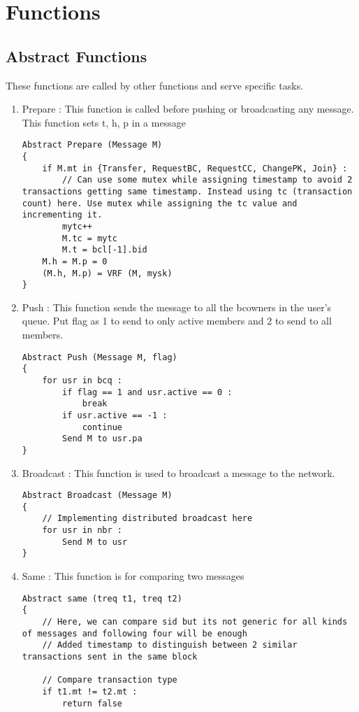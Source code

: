 \section{Functions}

\subsection{Abstract Functions}
These functions are called by other functions and serve specific tasks.
\begin{enumerate}
    \item Prepare : This function is called before pushing or broadcasting any message. This function sets t, h, p in a message
    \begin{lstlisting}
Abstract Prepare (Message M)
{
    if M.mt in {Transfer, RequestBC, RequestCC, ChangePK, Join} :
        // Can use some mutex while assigning timestamp to avoid 2 transactions getting same timestamp. Instead using tc (transaction count) here. Use mutex while assigning the tc value and incrementing it.
        mytc++
        M.tc = mytc
        M.t = bcl[-1].bid
    M.h = M.p = 0
    (M.h, M.p) = VRF (M, mysk)
}
    \end{lstlisting}
    \item Push : This function sends the message to all the bcowners in the user's queue. Put flag as 1 to send to only active members and 2 to send to all members.
    \begin{lstlisting}
Abstract Push (Message M, flag)
{
    for usr in bcq :
        if flag == 1 and usr.active == 0 :
            break
        if usr.active == -1 :
            continue
        Send M to usr.pa
}
    \end{lstlisting}
    \item Broadcast : This function is used to broadcast a message to the network.
    \begin{lstlisting}
Abstract Broadcast (Message M)
{
    // Implementing distributed broadcast here
    for usr in nbr :
        Send M to usr
}
    \end{lstlisting}
    \item Same : This function is for comparing two messages
    \begin{lstlisting}
Abstract same (treq t1, treq t2)
{
    // Here, we can compare sid but its not generic for all kinds of messages and following four will be enough
    // Added timestamp to distinguish between 2 similar transactions sent in the same block

    // Compare transaction type
    if t1.mt != t2.mt :
        return false
    

\end{lstlisting}
\end{enumerate}
